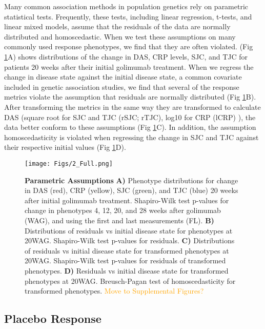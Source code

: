 Many common association methods in population genetics rely on parametric statistical tests. Frequently, these tests, including linear regression, t-tests, and linear mixed models, assume that the residuals of the data are normally distributed and homoscedastic. When we test these assumptions on many commonly used response phenotypes, we find that they are often violated. (Fig \ref{FIG_2}A) shows distributions of the change in DAS, CRP levels, SJC, and TJC for patients 20 weeks after their initial golimumab treatment. When we regress the change in disease state against the initial disease state, a common covariate included in genetic association studies, we find that several of the response metrics violate the assumption that residuals are normally distributed (Fig \ref{FIG_2}B). After transforming the metrics in the same way they are transformed to calculate DAS (square root for SJC and TJC (rSJC; rTJC), log10 for CRP (lCRP) ), the data better conform to these assumptions (Fig \ref{FIG_2}C). In addition, the assumption homoscedasticity is violated when regressing the change in SJC and TJC against their respective initial values (Fig \ref{FIG_2}D).

\begin{figure}[h!]
  \centering
  \texttt{[image: Figs/2\_Full.png]}
  \caption{ {\bf Parametric Assumptions} {\bf A)} Phenotype distributions for change in DAS (red), CRP (yellow), SJC (green), and TJC (blue) 20 weeks after initial golimumab treatment. Shapiro-Wilk test p-values for change in phenotypes 4, 12, 20, and 28 weeks after golimumab (WAG), and using the first and last measurements (FL). {\bf B)} Distributions of residuals vs initial disease state for phenotypes at 20WAG. Shapiro-Wilk test p-values for residuals. {\bf C)} Distributions of residuals vs initial disease state for transformed phenotypes at 20WAG. Shapiro-Wilk test p-values for residuals of transformed phenotypes. {\bf D)} Residuals vs initial disease state for transformed phenotypes at 20WAG. Breusch-Pagan test of homoscedasticity for transformed phenotypes. \textcolor{orange}{Move to Supplemental Figures?}}
  \label{FIG_2}
\end{figure}


\subsection{Placebo Response}

